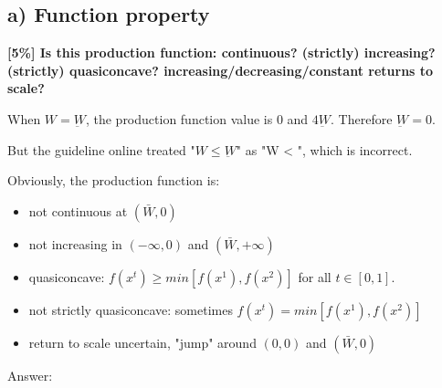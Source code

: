 \documentclass{article}
\begin{document}
\subsection{a) Function property}

\textbf{ [5\%] Is this production function: continuous? (strictly) increasing? (strictly) quasiconcave? increasing/decreasing/constant returns
to scale?}

\begin{mdframed}[backgroundcolor=blue!20,linecolor=white]

When $W = \underbar{W}$, the production function value is $0$ and $4\underbar{W}$. Therefore $\underbar{W} = 0$.

But the guideline online treated "$W \le \underbar{W}$" as "W < ", which is incorrect.

\begin{center}
\label{fig:hydro}
\end{center}
\vspace{2mm}

Obviously, the production function is:
\begin{itemize}
\item not continuous at $(\bar{W},0)$
\item not increasing in $(-\infty,0)$ and $(\bar{W},+\infty)$
\item quasiconcave: $f (x^t) \ge min[f (x^1), f (x^2)]$ for all $t ∈ [0, 1]$.
\item not strictly quasiconcave: sometimes $f (x^t) = min[f (x^1), f (x^2)]$
\item return to scale uncertain, "jump" around $(0,0)$ and $(\bar{W},0)$
\end{itemize}
\end{mdframed}

Answer:
\end{document}
